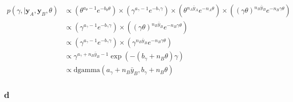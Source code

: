 \documentclass[]{article}
\begin{document}
\[
\begin{align}
p(\gamma, \mid \boldsymbol{y}_A, \boldsymbol{y}_B, \theta)
&\propto \left(\theta^{a_\theta - 1}e^{-b_\theta \theta}\right) \times \left(\gamma^{a_\gamma - 1}e^{-b_\gamma \gamma} \right) \times  \left( \theta^{n_A \bar{y}_A} e^{-n_A \theta} \right) \times \left( (\gamma \theta)^{n_B \bar{y}_B} e^{- n_B \gamma \theta} \right) \\
&\propto \left(\gamma^{a_\gamma - 1}e^{-b_\gamma \gamma} \right) \times \left( (\gamma \theta)^{n_B \bar{y}_B} e^{- n_B \gamma \theta} \right) \\
&\propto \left(\gamma^{a_\gamma - 1}e^{-b_\gamma \gamma} \right) \times \left( \gamma^{n_B \bar{y}_B} e^{- n_B \gamma \theta} \right) \\
&\propto \gamma^{a_\gamma + n_B \bar{y}_B - 1} \exp\left( -(b_\gamma + n_B \theta) \gamma \right) \\
&\propto \text{dgamma}\left(a_\gamma + n_B\bar{y}_B, b_\gamma + n_B \theta \right)
\end{align}
\]

\hypertarget{d}{%
\subsubsection{d}\label{d}}
\end{document}
